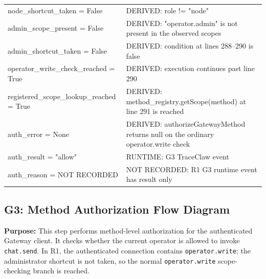 \begin{longtable}{
@{}
>{\raggedright\arraybackslash\ttfamily\footnotesize}
p{}
>{\raggedright\arraybackslash\ttfamily\scriptsize\color{gray}}
p{}
@{}
}
node\_shortcut\_taken = False
&
DERIVED:
role != "node"
\\[2mm]

admin\_scope\_present = False
&
DERIVED:
"operator.admin" is not present
in the observed scopes
\\[2mm]

admin\_shortcut\_taken = False
&
DERIVED:
condition at lines 288--290 is false
\\[2mm]

operator\_write\_check\_reached = True
&
DERIVED:
execution continues past line 290
\\[2mm]

registered\_scope\_lookup\_reached = True
&
DERIVED:
method\_registry.getScope(method)
at line 291 is reached
\\[2mm]

auth\_error = None
&
DERIVED:
authorizeGatewayMethod returns null
on the ordinary operator.write check
\\[2mm]

auth\_result = "allow"
&
RUNTIME:
G3 TraceClaw event
\\[2mm]

auth\_reason = NOT RECORDED
&
NOT RECORDED:
R1 G3 runtime event has result only
\\[2mm]

\bottomrule

\end{longtable}

\endgroup

\subsection*{G3: Method Authorization Flow Diagram}

\textbf{Purpose:}
This step performs method-level authorization for the authenticated
Gateway client. It checks whether the current operator is allowed to
invoke \texttt{chat.send}. In R1, the authenticated connection
contains \texttt{operator.write}; the administrator shortcut is not
taken, so the normal \texttt{operator.write} scope-checking branch is
reached.

